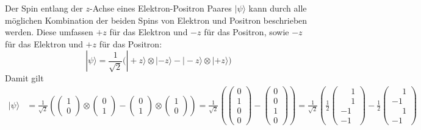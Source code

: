 \begin{refsection}
Der Spin entlang der $z$-Achse eines Elektron-Positron Paares $|\psi\rangle$
kann durch alle m\"oglichen Kombination der beiden Spins von Elektron und
Positron beschrieben werden. Diese umfassen $+z$ f\"ur das Elektron und $-z$
f\"ur das Positron, sowie $-z$ f\"ur das Elektron und $+z$ f\"ur das Positron:
\begin{equation}
    |\psi\rangle = \frac{1}{\sqrt{2}} \Big( 
        |{+}z\rangle \otimes |{-}z\rangle - |{-}z\rangle \otimes |{+}z\rangle
     \Big)
\end{equation}
Damit gilt
\begin{align}
    |\psi\rangle &= \frac{1}{\sqrt{2}} 
    \left( 
        \begin{pmatrix} 1\\0 \end{pmatrix} 
        \otimes 
        \begin{pmatrix} 0\\1 \end{pmatrix}
        -
        \begin{pmatrix} 0\\1 \end{pmatrix}
        \otimes
        \begin{pmatrix} 1\\0 \end{pmatrix}
     \right)
     =
     \frac{1}{\sqrt{2}}\left(
         \begin{pmatrix} 0 \\ 1 \\ 0 \\ 0 \end{pmatrix}
         -
         \begin{pmatrix} 0 \\ 0 \\ 1 \\ 0 \end{pmatrix}
     \right)
     = 
     \frac{1}{\sqrt{2}}\left(
         \frac{1}{2}
         \begin{pmatrix} \phantom{-}1 \\ \phantom{-}1 \\ -1 \\ -1 \end{pmatrix}
         -
         \frac{1}{2}
         \begin{pmatrix} \phantom{-}1 \\ -1 \\ \phantom{-}1 \\ -1 \end{pmatrix}

\end{align}
\end{refsection}
